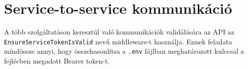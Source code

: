 \section{Service-to-service kommunikáció}
A több szolgáltatáson keresztül való kommunikációk validálására az API az \texttt{EnsureServiceTokenIsValid} nevű middleware-t használja. Ennek feladata mindössze annyi, hogy összehasonlítsa a \texttt{.env} fájlban meghatározott kulccsal a fejlécben megadott Bearer token-t.

